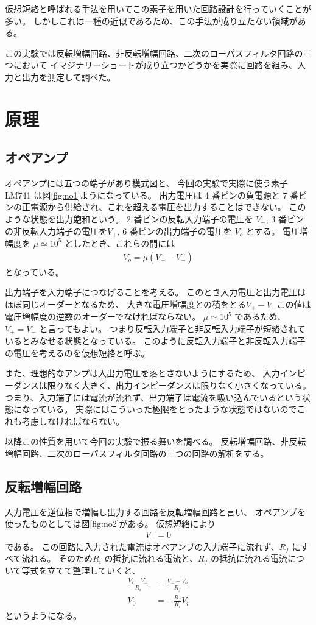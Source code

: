 \documentclass[11pt,dvipdfmx,a4paper]{jsarticle}
\begin{document}
仮想短絡と呼ばれる手法を用いてこの素子を用いた回路設計を行っていくことが多い。
しかしこれは一種の近似であるため、この手法が成り立たない領域がある。

この実験では反転増幅回路、非反転増幅回路、二次のローパスフィルタ回路の三つにおいて
イマジナリーショートが成り立つかどうかを実際に回路を組み、入力と出力を測定して調べた。

\section{原理}
\subsection{オペアンプ}

オペアンプには五つの端子があり模式図と、
今回の実験で実際に使う素子 LM741 は図\ref{fig:no1}ようになっている。
出力電圧は 4 番ピンの負電源と 7 番ピンの正電源から供給され、これを超える電圧を出力することはできない。
このような状態を出力飽和という。
2 番ピンの反転入力端子の電圧を \(V_{-}\), 3 番ピンの非反転入力端子の電圧を\(V_{+}\), 6 番ピンの出力端子の電圧を \(V_o\) とする。
電圧増幅度を \(\mu\simeq 10^5\) としたとき、これらの間には
\begin{align}
	V_o = \mu (V_{+} - V_{-})
\end{align}
となっている。

出力端子を入力端子につなげることを考える。
このとき入力電圧と出力電圧はほぼ同じオーダーとなるため、
大きな電圧増幅度との積をとる\(V_{+} - V_{-}\)この値は 電圧増幅度の逆数のオーダーでなければならない。
\(\mu\simeq10^5\) であるため、\(V_{+}=V_{-}\) と言ってもよい。
つまり反転入力端子と非反転入力端子が短絡されているとみなせる状態となっている。
このように反転入力端子と非反転入力端子の電圧を考えるのを仮想短絡と呼ぶ。

また、理想的なアンプは入出力電圧を落とさないようにするため、
入力インピーダンスは限りなく大きく、出力インピーダンスは限りなく小さくなっている。
つまり、入力端子には電流が流れず、出力端子は電流を吸い込んでいるという状態になっている。
実際にはこういった極限をとったような状態ではないのでこれも考慮しなければならない。

以降この性質を用いて今回の実験で振る舞いを調べる。
反転増幅回路、非反転増幅回路、二次のローパスフィルタ回路の三つの回路の解析をする。

\subsection{反転増幅回路}
入力電圧を逆位相で増幅し出力する回路を反転増幅回路と言い、
オペアンプを使ったものとしては図\ref{fig:no2}がある。
仮想短絡により
\begin{align}
	V_{-} = 0
\end{align}
である。
この回路に入力された電流はオペアンプの入力端子に流れず、\(R_{f}\) にすべて流れる。
そのため\(R_i\) の抵抗に流れる電流と、\(R_f\) の抵抗に流れる電流について等式を立てて整理していくと、
\begin{align}
	\frac{V_i-V_{-}}{R_i} &= \frac{V_{-}-V_o}{R_f}\\
	V_0 &= -\frac{R_f}{R_i} V_i
\end{align}
というようになる。
\end{document}
